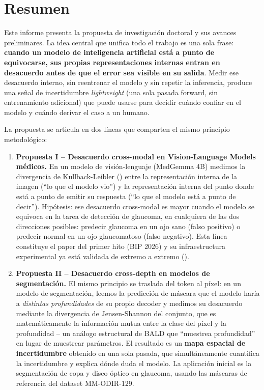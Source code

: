 \documentclass[12pt,a4paper]{article}
\newcommand{\KL}{\mathrm{KL}}
\begin{document}
\section{Resumen}

Este informe presenta la propuesta de investigación doctoral y sus avances preliminares.
La idea central que unifica todo el trabajo es una sola frase: \textbf{cuando un modelo de inteligencia artificial está a punto de equivocarse, sus propias representaciones internas entran en desacuerdo antes de que el error sea visible en su salida}.
Medir ese desacuerdo interno, sin reentrenar el modelo y sin repetir la inferencia, produce una señal de incertidumbre \textit{lightweight} (una sola pasada forward, sin entrenamiento adicional) que puede usarse para decidir cuándo confiar en el modelo y cuándo derivar el caso a un humano.

La propuesta se articula en dos líneas que comparten el mismo principio metodológico:

\begin{enumerate}
    \item \textbf{Propuesta I -- Desacuerdo cross-modal en Vision-Language Models médicos.}
    En un modelo de visión-lenguaje (MedGemma 4B) medimos la divergencia de Kullback-Leibler (\KL) entre la representación interna de la imagen (``lo que el modelo vio'') y la representación interna del punto donde está a punto de emitir su respuesta (``lo que el modelo está a punto de decir'').
    Hipótesis: ese desacuerdo cross-modal es mayor cuando el modelo se equivoca en la tarea de detección de glaucoma, en cualquiera de las dos direcciones posibles: predecir glaucoma en un ojo sano (falso positivo) o predecir normal en un ojo glaucomatoso (falso negativo).
    Esta línea constituye el paper del primer hito (BIP 2026) y su infraestructura experimental ya está validada de extremo a extremo ().

    \item \textbf{Propuesta II -- Desacuerdo cross-depth en modelos de segmentación.}
    El mismo principio se traslada del token al píxel: en un modelo de segmentación, leemos la predicción de máscara que el modelo haría a \textit{distintas profundidades} de su propio decoder y medimos su desacuerdo mediante la divergencia de Jensen-Shannon del conjunto, que es matemáticamente la información mutua entre la clase del píxel y la profundidad -- un análogo estructural de BALD que ``muestrea profundidad'' en lugar de muestrear parámetros.
    El resultado es un \textbf{mapa espacial de incertidumbre} obtenido en una sola pasada, que simultáneamente cuantifica la incertidumbre y explica dónde duda el modelo.
    La aplicación inicial es la segmentación de copa y disco óptico en glaucoma, usando las máscaras de referencia del dataset MM-ODIR-129.
\end{enumerate}
\end{document}
